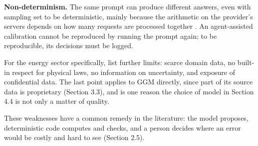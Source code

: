 \textbf{Non-determinism.} The same prompt can produce different answers, even with sampling set to be deterministic, mainly because the arithmetic on the provider's servers depends on how many requests are processed together \citep{he2025defeating}.
An agent-assisted calibration cannot be reproduced by running the prompt again; to be reproducible, its decisions must be logged.

For the energy sector specifically, \citet{majumder2024exploring} list further limits: scarce domain data, no built-in respect for physical laws, no information on uncertainty, and exposure of confidential data.
The last point applies to GGM directly, since part of its source data is proprietary (Section 3.3), and is one reason the choice of model in Section 4.4 is not only a matter of quality.

These weaknesses have a common remedy in the literature: the model proposes, deterministic code computes and checks, and a person decides where an error would be costly and hard to see (Section 2.5).

